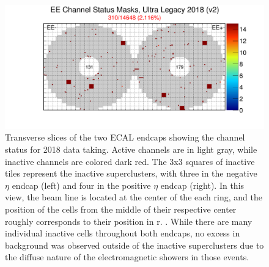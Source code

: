 \begin{figure}[ht]
    \includegraphics[width=\textwidth]{figures/EEChannelMasks.png}
    \centering
	\caption[Masked ECAL cells]{Transverse slices of the two ECAL endcaps showing the channel status for 2018 data taking. Active channels are in light gray, while inactive channels are colored dark red. The 3x3 squares of inactive tiles represent the inactive superclusters, with three in the negative $\eta$ endcap (left) and four in the positive $\eta$ endcap (right). In this view, the beam line is located at the center of the each ring, and the position of the cells from the middle of their respective center roughly corresponds to their position in r. \cite{EcalDPG}. While there are many individual inactive cells throughout both endcaps, no excess in background was observed outside of the inactive superclusters due to the diffuse nature of the electromagnetic showers in those events.}
    \label{fig:EEmasks}
\end{figure}

